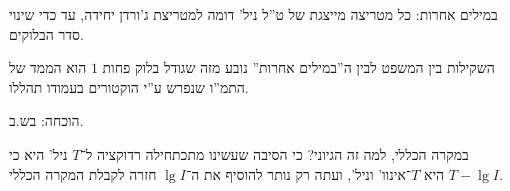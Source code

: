 \documentclass[]{../../../../tex/classes/styledArticle}
\begin{document}
    
    במילים אחרות: כל מטריצה מייצגת של ט''ל ניל' דומה למטריצת ג'ורדן יחידה, עד כדי שינוי סדר הבלוקים. 
    
    השקילות בין המשפט לבין ה''במילים אחרות'' נובע מזה שגודל בלוק פחות $1$ הוא הממד של התמ''ו שנפרש ע''י הוקטורים בעמודו תהללו. 
    
    הוכחה: בש.ב. 
    
    במקרה הכללי, 
    למה זה הגיוני? כי הסיבה שעשינו מתכתחילה רדוקציה ל־$T$ ניל' היא כי $T - \lg I$ היא $T$־אינוו' וניל', ועתה רק נותר להוסיף את ה־$\lg I$ חזרה לקבלת המקרה הכללי. 
    
\end{document}
